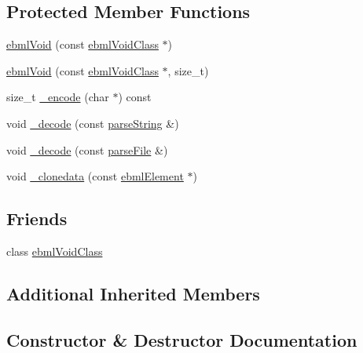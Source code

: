 \subsection*{Protected Member Functions}
\begin{DoxyCompactItemize}
\item 
\mbox{\hyperlink{classebml_1_1ebmlVoid_a3d6c579df46368e2b7bc78baab53c437}{ebml\+Void}} (const \mbox{\hyperlink{classebml_1_1ebmlVoidClass}{ebml\+Void\+Class}} $\ast$)
\item 
\mbox{\hyperlink{classebml_1_1ebmlVoid_a8f029c869cc3f14d1eea3c358e56bf1a}{ebml\+Void}} (const \mbox{\hyperlink{classebml_1_1ebmlVoidClass}{ebml\+Void\+Class}} $\ast$, size\+\_\+t)
\item 
size\+\_\+t \mbox{\hyperlink{classebml_1_1ebmlVoid_a58183338cb3b41b188cddfbb09a281d5}{\+\_\+encode}} (char $\ast$) const
\item 
void \mbox{\hyperlink{classebml_1_1ebmlVoid_a4d5d56b3b45c18c5732a4e0d68762f87}{\+\_\+decode}} (const \mbox{\hyperlink{classebml_1_1parseString}{parse\+String}} \&)
\item 
void \mbox{\hyperlink{classebml_1_1ebmlVoid_a3bf4c4cb979b33f513fd224329aee162}{\+\_\+decode}} (const \mbox{\hyperlink{classebml_1_1parseFile}{parse\+File}} \&)
\item 
void \mbox{\hyperlink{classebml_1_1ebmlVoid_a1319a15cbec91a7f52763c30d7fa3a18}{\+\_\+clonedata}} (const \mbox{\hyperlink{classebml_1_1ebmlElement}{ebml\+Element}} $\ast$)
\end{DoxyCompactItemize}
\subsection*{Friends}
\begin{DoxyCompactItemize}
\item 
class \mbox{\hyperlink{classebml_1_1ebmlVoid_ac7fd92f117d3b9c559a6d1725f579f9b}{ebml\+Void\+Class}}
\end{DoxyCompactItemize}
\subsection*{Additional Inherited Members}


\subsection{Constructor \& Destructor Documentation}
\mbox{\label{classebml_1_1ebmlVoid_a3d6c579df46368e2b7bc78baab53c437}} 
